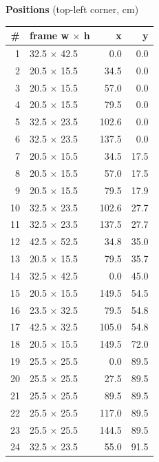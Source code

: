 \documentclass[a4paper,landscape,10pt]{article}
\begin{document}
\begin{minipage}[t]{0.25\textwidth}
\vspace{8pt}
{\bfseries Positions} (top-left corner, cm)\\[2pt]
\tiny
\begin{tabular}{@{}r l r r@{}}
\toprule
\# & frame w $\times$ h & x & y \\
\midrule
1 & 32.5 $\times$ 42.5 & 0.0 & 0.0 \\
2 & 20.5 $\times$ 15.5 & 34.5 & 0.0 \\
3 & 20.5 $\times$ 15.5 & 57.0 & 0.0 \\
4 & 20.5 $\times$ 15.5 & 79.5 & 0.0 \\
5 & 32.5 $\times$ 23.5 & 102.6 & 0.0 \\
6 & 32.5 $\times$ 23.5 & 137.5 & 0.0 \\
7 & 20.5 $\times$ 15.5 & 34.5 & 17.5 \\
8 & 20.5 $\times$ 15.5 & 57.0 & 17.5 \\
9 & 20.5 $\times$ 15.5 & 79.5 & 17.9 \\
10 & 32.5 $\times$ 23.5 & 102.6 & 27.7 \\
11 & 32.5 $\times$ 23.5 & 137.5 & 27.7 \\
12 & 42.5 $\times$ 52.5 & 34.8 & 35.0 \\
13 & 20.5 $\times$ 15.5 & 79.5 & 35.7 \\
14 & 32.5 $\times$ 42.5 & 0.0 & 45.0 \\
15 & 20.5 $\times$ 15.5 & 149.5 & 54.5 \\
16 & 23.5 $\times$ 32.5 & 79.5 & 54.8 \\
17 & 42.5 $\times$ 32.5 & 105.0 & 54.8 \\
18 & 20.5 $\times$ 15.5 & 149.5 & 72.0 \\
19 & 25.5 $\times$ 25.5 & 0.0 & 89.5 \\
20 & 25.5 $\times$ 25.5 & 27.5 & 89.5 \\
21 & 25.5 $\times$ 25.5 & 89.5 & 89.5 \\
22 & 25.5 $\times$ 25.5 & 117.0 & 89.5 \\
23 & 25.5 $\times$ 25.5 & 144.5 & 89.5 \\
24 & 32.5 $\times$ 23.5 & 55.0 & 91.5 \\
\bottomrule
\end{tabular}
\end{minipage}
\clearpage
\end{document}
